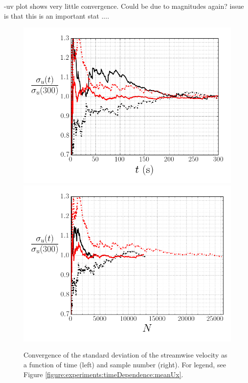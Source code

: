 \documentclass[12pt,oneside,a4paper]{article}
\begin{document}
-uv plot shows very little convergence. Could be due to magnitudes again? issue is that this is an important stat .... 

\begin{figure}
\centering
\includegraphics[width=0.5\linewidth]{images/LDA_timeDependenceImages/uxRMSTConvergence.png}\hfill
\includegraphics[width=0.5\linewidth]{images/LDA_timeDependenceImages/uxRMSNConvergence.png}\\
\caption{Convergence of the standard deviation of the streamwise velocity as a function of time (left) and sample number (right). For legend, see Figure \ref{figure:experiments:timeDependence:meanUx}.}
\label{figure:experiments:timeDependence:RMSux}
\end{figure}
\end{document}
